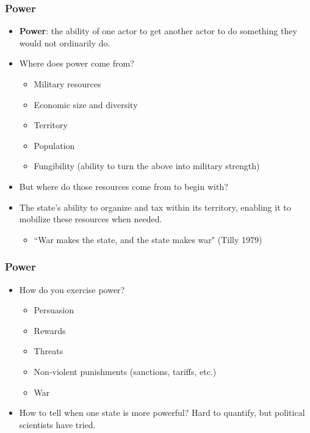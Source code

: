 \documentclass{beamer}
\begin{document}
\begin{frame} 
\frametitle{\LARGE{Power}}
\begin{itemize}
    \item \textbf{Power}: the ability of one actor to get another actor to do something they would not ordinarily do. \pause
    \item Where does power come from? \pause
    \begin{itemize}
        \item Military resources \pause
        \item Economic size and diversity \pause
        \item Territory \pause
        \item Population \pause
        \item Fungibility (ability to turn the above into military strength) \pause
    \end{itemize}
    \item But where do those resources come from to begin with? \pause
    \item The state's ability to organize and tax within its territory, enabling it to mobilize these resources when needed.
    \begin{itemize}
    	\item ``War makes the state, and the state makes war" (Tilly 1979)
    \end{itemize}
\end{itemize}
\end{frame}

\begin{frame} 
\frametitle{\LARGE{Power}}
\begin{itemize}
    \item How do you exercise power? \pause
    \begin{itemize}
        \item Persuasion \pause
        \item Rewards \pause
        \item Threats \pause
        \item Non-violent punishments (sanctions, tariffs, etc.) \pause
        \item War \pause
    \end{itemize}
    \item How to tell when one state is more powerful? Hard to quantify, but political scientists have tried.
\end{itemize}
\end{frame}
\end{document}
